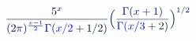 \documentclass[12pt]{article}
\begin{document}
\makeatletter
\renewcommand*{\@textcolor}[3]{%
  \protect\leavevmode
  \begingroup
    \color#1{#2}#3%
  \endgroup
}
\makeatother
\begin{displaymath}
\mathcolor[RGB]{0,0,15}{\frac { \mathcolor[RGB]{0,0,30}{5} ^ { \mathcolor[RGB]{0,0,45}{x} } } { \mathcolor[RGB]{0,0,60}{(} \mathcolor[RGB]{0,0,75}{2} \mathcolor[RGB]{0,0,90}{\pi} \mathcolor[RGB]{0,0,105}{)} ^ { \mathcolor[RGB]{0,0,120}{\frac { \mathcolor[RGB]{0,0,135}{x} \mathcolor[RGB]{0,0,150}{-} \mathcolor[RGB]{0,0,165}{1} } { \mathcolor[RGB]{0,0,180}{2} } } } \mathcolor[RGB]{0,0,195}{\Gamma} \mathcolor[RGB]{0,0,210}{(} \mathcolor[RGB]{0,0,225}{x} \mathcolor[RGB]{0,0,240}{/} \mathcolor[RGB]{0,0,255}{2} \mathcolor[RGB]{0,15,0}{+} \mathcolor[RGB]{0,15,15}{1} \mathcolor[RGB]{0,15,30}{/} \mathcolor[RGB]{0,15,45}{2} \mathcolor[RGB]{0,15,60}{)} } } \mathcolor[RGB]{0,15,75}{\Bigl(} \mathcolor[RGB]{0,15,90}{\frac { \mathcolor[RGB]{0,15,105}{\Gamma} \mathcolor[RGB]{0,15,120}{(} \mathcolor[RGB]{0,15,135}{x} \mathcolor[RGB]{0,15,150}{+} \mathcolor[RGB]{0,15,165}{1} \mathcolor[RGB]{0,15,180}{)} } { \mathcolor[RGB]{0,15,195}{\Gamma} \mathcolor[RGB]{0,15,210}{(} \mathcolor[RGB]{0,15,225}{x} \mathcolor[RGB]{0,15,240}{/} \mathcolor[RGB]{0,15,255}{3} \mathcolor[RGB]{0,30,0}{+} \mathcolor[RGB]{0,30,15}{2} \mathcolor[RGB]{0,30,30}{)} } } \mathcolor[RGB]{0,30,45}{\Bigr)} ^ { \mathcolor[RGB]{0,30,60}{1} \mathcolor[RGB]{0,30,75}{/} \mathcolor[RGB]{0,30,90}{2} }
\end{displaymath}
\end{document}
